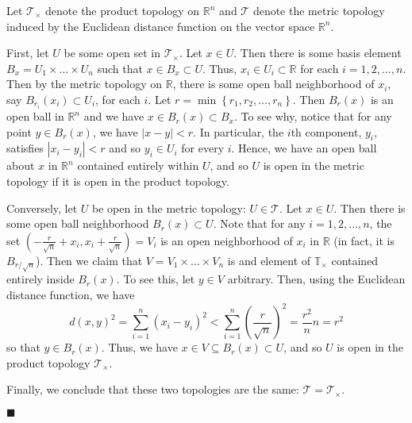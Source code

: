 \documentclass[12pt]{article}
\renewcommand{\qed}{\hfill$\blacksquare$}
\renewenvironment{proof}{\begin{addmargin}[1em]{0em}\begin{newproof}}{\end{newproof}\end{addmargin}\qed}
\begin{document}
\begin{proof}
Let $\mathcal{T}_{\times}$ denote the product topology on $\mathbb{R}^n$ and $\mathcal{T}$ denote the metric topology induced by the Euclidean distance function on the vector space $\mathbb{R}^n$.

First, let $U$ be some open set in $\mathcal{T}_{\times}$. Let $x \in U$. Then there is some basis element $B_x = U_1 \times \ldots \times U_n$ such that $x \in B_x \subset U$. Thus, $x_i \in U_i \subset \mathbb{R}$ for each $i=1,2,\ldots,n$. Then by the metric topology on $\mathbb{R}$, there is some open ball neighborhood of $x_i$, say $B_{r_i}\left(x_i\right) \subset U_i$, for each $i$.  Let $r = \min \left\{ r_1, r_2,\ldots,r_n\right\}$. Then $B_r\left(x\right)$ is an open ball in $\mathbb{R}^n$ and we have $x \in B_r\left(x\right) \subset B_x$. To see why, notice that for any point $y \in B_r\left(x\right)$, we have $\left\lvert x-y\right\rvert < r$. In particular, the $i$th component, $y_i$, satisfies $\left|x_i-y_i\right| < r$ and so $y_i \in U_i$ for every $i$. Hence, we have an open ball about $x$ in $\mathbb{R}^n$ contained entirely within $U$, and so $U$ is open in the metric topology if it is open in the product topology.

Conversely, let $U$ be open in the metric topology: $U \in \mathcal{T}$. Let $x\in U$. Then there is some open ball neighborhood $B_r\left(x\right) \subset U$. Note that for any $i=1,2,\ldots,n$, the set $\left(-\frac{r}{\sqrt{n}}+x_i, x_i + \frac{r}{\sqrt{n}}\right) = V_i$ is an open neighborhood of $x_i$ in $\mathbb{R}$ (in fact, it is $B_{r/\sqrt{n}}$). Then we claim that $V = V_1 \times \ldots \times V_n$ is and element of $\mathbb{T}_{\times}$ contained entirely inside $B_r\left(x\right)$. To see this, let $y \in V$ arbitrary. Then, using the Euclidean distance function, we have $$ d\left(x,y\right)^2 = \sum_{i=1}^n \left(x_i-y_i\right)^2 < \sum_{i=1}^n \left( \frac{r}{\sqrt{n}}\right)^2 = \frac{r^2}{n}n = r^2$$ so that $y\in B_r\left(x\right)$. Thus, we have $x \in V \subseteq B_r\left(x\right) \subset U$, and so $U$ is open in the product topology $\mathcal{T}_{\times}$.

Finally, we conclude that these two topologies are the same: $\mathcal{T}=\mathcal{T}_{\times}$.
\end{proof}
\end{document}
